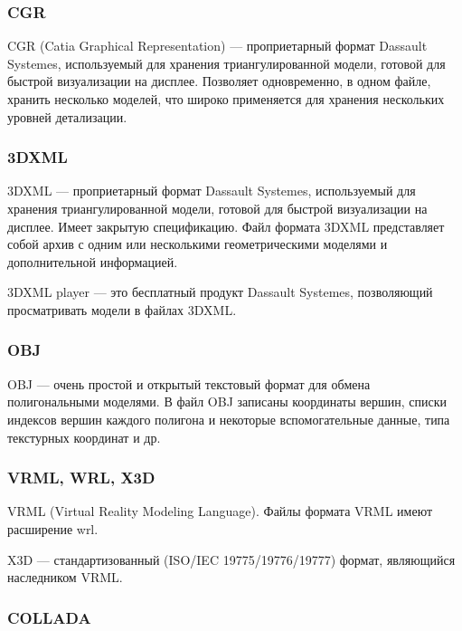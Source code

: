 \subsubsection{CGR}\label{sec:secCGR}


CGR (Catia Graphical Representation) --- проприетарный формат Dassault Systemes, используемый для хранения триангулированной модели, готовой для быстрой визуализации на дисплее.
Позволяет одновременно, в одном файле, хранить несколько моделей, что широко применяется для хранения нескольких уровней детализации.

\subsubsection{3DXML}\label{sec:sec3dXML}

3DXML --- проприетарный формат Dassault Systemes, используемый для хранения триангулированной модели, готовой для быстрой визуализации на дисплее.
Имеет закрытую спецификацию. Файл формата 3DXML представляет собой архив с одним или несколькими геометрическими моделями и дополнительной информацией.

3DXML player --- это бесплатный продукт Dassault Systemes, позволяющий просматривать модели в файлах 3DXML.

\subsubsection{OBJ}\label{sec:secOBJ}

OBJ --- очень простой и открытый текстовый формат для обмена полигональными моделями. В файл OBJ записаны координаты вершин, списки индексов вершин каждого полигона и некоторые вспомогательные данные, типа текстурных координат и др.

\subsubsection{VRML, WRL, X3D}\label{sec:secVRML}

VRML (Virtual Reality Modeling Language). Файлы формата VRML имеют расширение wrl.

X3D --- стандартизованный (ISO/IEC 19775/19776/19777) формат, являющийся наследником VRML.

\subsubsection{COLLADA}\label{sec:secCOLLADA}

